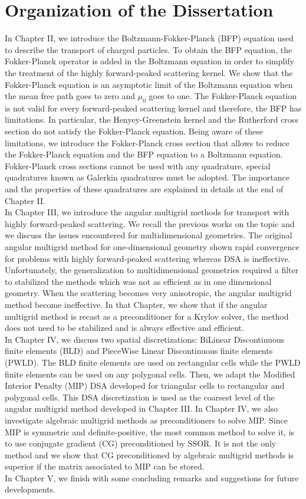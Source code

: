 \section{Organization of the Dissertation}
\noindent In Chapter II, we introduce the Boltzmann-Fokker-Planck (BFP)
equation used to describe the transport of charged particles. To obtain the
BFP equation, the Fokker-Planck operator is added in the Boltzmann equation in 
order to simplify
the treatment of the highly forward-peaked scattering kernel. We show that the
Fokker-Planck equation is an asymptotic limit of the Boltzmann equation when the
mean free path goes to zero and $\mu_0$ goes to one. The Fokker-Planck
equation is not valid for every forward-peaked scattering kernel and
therefore, the BFP has limitations. In particular, the Henyey-Greenstein kernel
and the Rutherford cross section do not satisfy the Fokker-Planck equation.
Being aware of these limitations, we introduce the Fokker-Planck cross
section that allows to reduce the Fokker-Planck equation and the BFP equation
to a Boltzmann equation. Fokker-Planck cross sections cannot be used with any
quadrature, special quadratures known as Galerkin quadratures must be adopted.
The importance and the properties of these quadratures are explained in
details at the end of Chapter II.\\

\noindent In Chapter III, we introduce the angular multigrid methods for 
transport with highly forward-peaked scattering. We recall the previous works 
on the topic and we discuss the issues encountered for multidimensional 
geometries. The original angular multigrid method for one-dimensional geometry
shown rapid convergence for problems with highly forward-peaked
scattering whereas DSA is ineffective. Unfortunately, the generalization to
multidimensional geometries required a filter to stabilized the methods which
was not as efficient as in one dimensional geometry. When the scattering
becomes very anisotropic, the angular multigrid method become ineffective. In
that Chapter, we show that if the angular multigrid method is recast as a
preconditioner for a Krylov solver, the method does not need to be stabilized
and is always effective and efficient.\\

\noindent In Chapter IV, we discuss two spatial discretizations: BiLinear
Discontinuous finite elements (BLD) and PieceWise Linear Discontinuous finite
elements (PWLD). The BLD finite elements are used on rectangular cells while
the PWLD finite elements can be used on any polygonal cells. Then, 
we adapt the Modified Interior Penalty (MIP) DSA developed for triangular cells to
rectangular and polygonal cells. This DSA discretization is used as the
coarsest level of the angular multigrid method developed in Chapter III. In
Chapter IV, we also investigate algebraic multigrid methods as preconditioners
to solve MIP. Since MIP is symmetric and definite-positive, the most
common method to solve it, is to use conjugate gradient (CG) preconditioned by
SSOR. It is not the only method and we show that CG preconditioned by
algebraic multigrid methods is superior if the matrix associated to MIP can be
stored.\\

\noindent In Chapter V, we finish with some concluding remarks and suggestions for
future developments.
